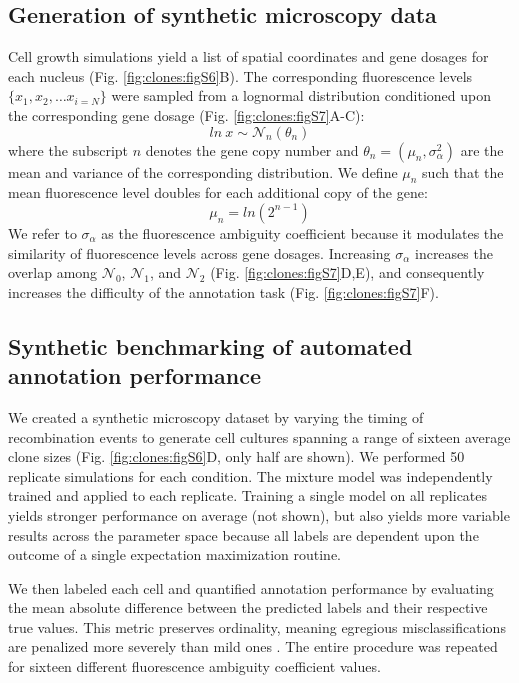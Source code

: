 \subsection{Generation of synthetic microscopy data}
\label{appendix:methods:clones:fluorescence_simulation}

Cell growth simulations yield a list of spatial coordinates and gene dosages for each nucleus (Fig. \ref{fig:clones:figS6}B). The corresponding fluorescence levels $\{x_1, x_2, \ldots x_{i=N} \}$ were sampled from a lognormal distribution conditioned upon the corresponding gene dosage (Fig. \ref{fig:clones:figS7}A-C):
\begin{equation}
ln\ x \sim \mathcal{N}_n(\theta _n)
\end{equation}
where the subscript $n$ denotes the gene copy number and $\theta_n = (\mu_n,\sigma_{\alpha}^2)$ are the mean and variance of the corresponding distribution. We define $\mu_n$ such that the mean fluorescence level doubles for each additional copy of the gene:
\begin{equation}
\mu_{n } = ln(2^{n-1})
\end{equation}
We refer to $\sigma_{\alpha}$ as the fluorescence ambiguity coefficient because it modulates the similarity of fluorescence levels across gene dosages. Increasing $\sigma_{\alpha}$ increases the overlap among $\mathcal{N}_0$, $\mathcal{N}_1$, and $\mathcal{N}_2$ (Fig. \ref{fig:clones:figS7}D,E), and consequently increases the difficulty of the annotation task (Fig. \ref{fig:clones:figS7}F).

\subsection{Synthetic benchmarking of automated annotation performance}
\label{appendix:methods:clones:benchmarking}

We created a synthetic microscopy dataset by varying the timing of recombination events to generate cell cultures spanning a range of sixteen average clone sizes (Fig. \ref{fig:clones:figS6}D, only half are shown). We performed 50 replicate simulations for each condition. The mixture model was independently trained and applied to each replicate. Training a single model on all replicates yields stronger performance on average (not shown), but also yields more variable results across the parameter space because all labels are dependent upon the outcome of a single expectation maximization routine.

We then labeled each cell and quantified annotation performance by evaluating the mean absolute difference between the predicted labels and their respective true values. This metric preserves ordinality, meaning egregious misclassifications are penalized more severely than mild ones \cite{Gaudette2009}. The entire procedure was repeated for sixteen different fluorescence ambiguity coefficient values.